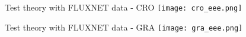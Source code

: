 \documentclass[aspectratio=169]{beamer}
\begin{document}
\begin{frame}{Test theory with FLUXNET data - CRO}
  \texttt{[image: cro\_eee.png]}
\end{frame}

\begin{frame}{Test theory with FLUXNET data - GRA}
  \texttt{[image: gra\_eee.png]}
\end{frame}







\end{document}

